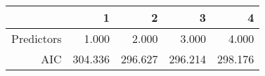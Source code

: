 \begin{table}[ht]
\centering
\begin{tabular}{rrrrr}
  \hline
 & 1 & 2 & 3 & 4 \\ 
  \hline
Predictors & 1.000 & 2.000 & 3.000 & 4.000 \\ 
  AIC & 304.336 & 296.627 & 296.214 & 298.176 \\ 
   \hline
\end{tabular}
\end{table}
